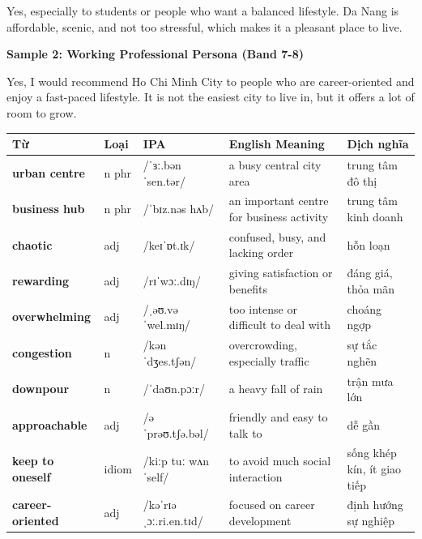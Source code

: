 Yes, especially to students or people who want a balanced lifestyle. Da Nang is affordable, scenic, and not too stressful, which makes it a pleasant place to live.

\textbf{Sample 2: Working Professional Persona (Band 7-8)}

Yes, I would recommend Ho Chi Minh City to people who are career-oriented and enjoy a fast-paced lifestyle. It is not the easiest city to live in, but it offers a lot of room to grow.

\separator


\vspace{0.8em}
\begin{center}
\renewcommand{\arraystretch}{1.65}
\begin{tabularx}{\textwidth}{|V{0.22\textwidth}|C{0.07\textwidth}|I{0.20\textwidth}|Y|V{0.18\textwidth}|}
\hline
{}
\textbf{Từ} & \textbf{Loại} & \textbf{IPA} & \textbf{English Meaning} & \textbf{Dịch nghĩa} \\
\hline
\textbf{urban centre} & n phr & /ˈɜː.bən ˈsen.tər/ & a busy central city area & trung tâm đô thị \\ \hline
\textbf{business hub} & n phr & /ˈbɪz.nəs hʌb/ & an important centre for business activity & trung tâm kinh doanh \\ \hline
\textbf{chaotic} & adj & /keɪˈɒt.ɪk/ & confused, busy, and lacking order & hỗn loạn \\ \hline
\textbf{rewarding} & adj & /rɪˈwɔː.dɪŋ/ & giving satisfaction or benefits & đáng giá, thỏa mãn \\ \hline
\textbf{overwhelming} & adj & /ˌəʊ.vəˈwel.mɪŋ/ & too intense or difficult to deal with & choáng ngợp \\ \hline
\textbf{congestion} & n & /kənˈdʒes.tʃən/ & overcrowding, especially traffic & sự tắc nghẽn \\ \hline
\textbf{downpour} & n & /ˈdaʊn.pɔːr/ & a heavy fall of rain & trận mưa lớn \\ \hline
\textbf{approachable} & adj & /əˈprəʊ.tʃə.bəl/ & friendly and easy to talk to & dễ gần \\ \hline
\textbf{keep to oneself} & idiom & /kiːp tuː wʌnˈself/ & to avoid much social interaction & sống khép kín, ít giao tiếp \\ \hline
\textbf{career-oriented} & adj & /kəˈrɪə ˌɔː.ri.en.tɪd/ & focused on career development & định hướng sự nghiệp \\ \hline
\end{tabularx}
\end{center}

